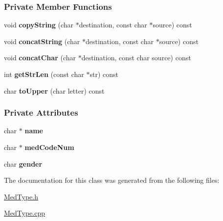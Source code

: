 \subsubsection*{Private Member Functions}
\begin{DoxyCompactItemize}
\item 
\hypertarget{class_med_type_ab360a99d20749be4737f8edc1acb7a41}{}void {\bfseries copy\+String} (char $\ast$destination, const char $\ast$source) const \label{class_med_type_ab360a99d20749be4737f8edc1acb7a41}

\item 
\hypertarget{class_med_type_ab4687b400d6c2d4e8cfb90fdfeed8f8c}{}void {\bfseries concat\+String} (char $\ast$destination, const char $\ast$source) const \label{class_med_type_ab4687b400d6c2d4e8cfb90fdfeed8f8c}

\item 
\hypertarget{class_med_type_a21462de5208d9306eea0292367978605}{}void {\bfseries concat\+Char} (char $\ast$destination, const char source) const \label{class_med_type_a21462de5208d9306eea0292367978605}

\item 
\hypertarget{class_med_type_a2281a83f021e39c3d41a570912679ef3}{}int {\bfseries get\+Str\+Len} (const char $\ast$str) const \label{class_med_type_a2281a83f021e39c3d41a570912679ef3}

\item 
\hypertarget{class_med_type_a9256d75c5cc829d0d8537f411f6f45f6}{}char {\bfseries to\+Upper} (char letter) const \label{class_med_type_a9256d75c5cc829d0d8537f411f6f45f6}

\end{DoxyCompactItemize}
\subsubsection*{Private Attributes}
\begin{DoxyCompactItemize}
\item 
\hypertarget{class_med_type_ad7447d240f24f0caaf3d026138fdaab6}{}char $\ast$ {\bfseries name}\label{class_med_type_ad7447d240f24f0caaf3d026138fdaab6}

\item 
\hypertarget{class_med_type_ad5bf7c5a9d5b41726f5e897f75eda192}{}char $\ast$ {\bfseries med\+Code\+Num}\label{class_med_type_ad5bf7c5a9d5b41726f5e897f75eda192}

\item 
\hypertarget{class_med_type_a11d372d67cb73d040fa44d6db178632b}{}char {\bfseries gender}\label{class_med_type_a11d372d67cb73d040fa44d6db178632b}

\end{DoxyCompactItemize}


The documentation for this class was generated from the following files\+:\begin{DoxyCompactItemize}
\item 
\hyperlink{_med_type_8h}{Med\+Type.\+h}\item 
\hyperlink{_med_type_8cpp}{Med\+Type.\+cpp}\end{DoxyCompactItemize}

